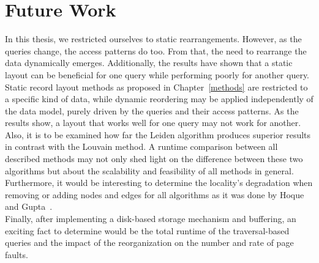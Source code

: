 \section{Future Work}\label{\positionnumber}
In this thesis, we restricted ourselves to static rearrangements.
However, as the queries change, the access patterns do too.
From that, the need to rearrange the data dynamically emerges.
Additionally, the results have shown that a static layout can be beneficial for one query while performing poorly for another query.
Static record layout methods as proposed in Chapter~\ref{methods} are restricted to a specific kind of data, while dynamic reordering may be applied independently of the data model, purely driven by the queries and their access patterns. As the results show, a layout that works well for one query may not work for another. \\
Also, it is to be examined how far the Leiden algorithm produces superior results in contrast with the Louvain method. 
A runtime comparison between all described methods may not only shed light on the difference between these two algorithms but about the scalability and feasibility of all methods in general. \\
Furthermore, it would be interesting to determine the locality's degradation when removing or adding nodes and edges for all algorithms as it was done by Hoque and Gupta~\autocite{hoque2012disk}. \\
Finally, after implementing a disk-based storage mechanism and buffering, an exciting fact to determine would be the total runtime of the traversal-based queries and the impact of the reorganization on the number and rate of page faults.

